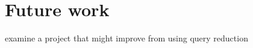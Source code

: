 \chapter{Future work}\label{chapter:future-work}

examine a project that might improve from using query reduction